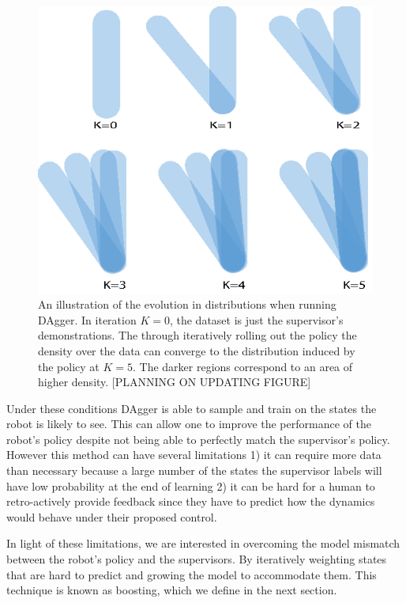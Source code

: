 \documentclass[10pt, conference]{ieeeconf}      %
\begin{document}
\begin{figure}
\centering
\includegraphics{f_figs/dagger.eps}
\caption{
    \footnotesize
An illustration of the evolution in distributions when running DAgger. In iteration $K=0$, the dataset is just the supervisor's demonstrations. The through iteratively rolling out the policy the density over the data can converge to the distribution induced by the policy at $K=5$. The darker regions correspond to an area of higher density. [PLANNING ON UPDATING FIGURE]}
\vspace*{-20pt}
\label{fig:graphModel}
\end{figure}

Under these conditions DAgger is able to sample and train on the states the robot is likely to see. This can allow one to improve the performance of the robot's policy despite not being able to perfectly match the supervisor's policy. However this method can have several limitations 1) it can require more data than necessary because a large number of the states the supervisor labels will have low probability at the end of learning 2) it can be hard for a human to retro-actively provide feedback since they have to predict how the dynamics would behave under their proposed control. 

In light of these limitations, we are interested in overcoming the model mismatch between the robot's policy and the supervisors. By iteratively weighting states that are hard to predict and growing the model to accommodate them. This technique is known as boosting, which we define in the next section. 
\end{document}

